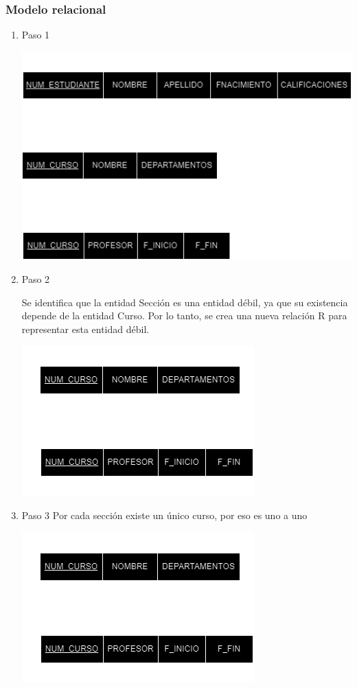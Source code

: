 \documentclass[a4paper,12pt]{article}
\begin{document}
\subsubsection*{Modelo relacional}
\begin{enumerate}
    \item[] Paso 1
    \begin{center}
        \includegraphics[scale = .5]{IMA/E1P1.png}    
    \end{center}
    \item[] Paso 2
    
    Se identifica que la entidad Sección es una entidad débil, ya que su existencia depende de la entidad Curso. Por lo tanto, se crea una nueva relación R para representar esta entidad débil.
    \begin{center}
        \includegraphics[scale = .5]{IMA/E1P2.png}    
    \end{center}
    
    \newpage
    \item[] Paso 3
    \thispagestyle{fancy} %
    Por cada sección existe un único curso, por eso es uno a uno
    \begin{center}
        \includegraphics[scale = .5]{IMA/E1P2.png}    
    \end{center}
    

\end{enumerate}
\end{document}
